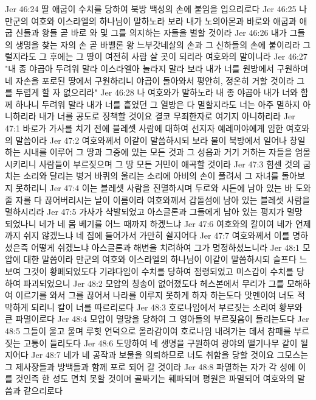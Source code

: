 Jer 46:24  딸 애굽이 수치를 당하여 북방 백성의 손에 붙임을 입으리로다
Jer 46:25  나 만군의 여호와 이스라엘의 하나님이 말하노라 보라 내가 노의아몬과 바로와 애굽과 애굽 신들과 왕들 곧 바로 와 및 그를 의지하는 자들을 벌할 것이라
Jer 46:26  내가 그들의 생명을 찾는 자의 손 곧 바벨론 왕 느부갓네살의 손과 그 신하들의 손에 붙이리라 그럴지라도 그 후에는 그 땅이 여전히 사람 살 곳이 되리라 여호와의 말이니라
Jer 46:27  "내 종 야곱아 두려워 말라 이스라엘아 놀라지 말라 보라 내가 너를 원방에서 구원하며 네 자손을 포로된 땅에서 구원하리니 야곱이 돌아와서 평안히, 정온히 거할 것이라 그를 두렵게 할 자 없으리라"
Jer 46:28  나 여호와가 말하노라 내 종 야곱아 내가 너와 함께 하나니 두려워 말라 내가 너를 흩었던 그 열방은 다 멸할지라도 너는 아주 멸하지 아니하리라 내가 너를 공도로 징책할 것이요 결코 무죄한자로 여기지 아니하리라
Jer 47:1  바로가 가사를 치기 전에 블레셋 사람에 대하여 선지자 예레미야에게 임한 여호와의 말씀이라
Jer 47:2  여호와께서 이같이 말씀하시되 보라 물이 북방에서 일어나 창일하는 시내를 이루어 그 땅과 그중에 있는 모든 것과 그 성읍과 거기 거하는 자들을 엄몰시키리니 사람들이 부르짖으며 그 땅 모든 거민이 애곡할 것이라
Jer 47:3  힘센 것의 굽 치는 소리와 달리는 병거 바퀴의 울리는 소리에 아비의 손이 풀려서 그 자녀를 돌아보지 못하리니
Jer 47:4  이는 블레셋 사람을 진멸하시며 두로와 시돈에 남아 있는 바 도와줄 자를 다 끊어버리시는 날이 이름이라 여호와께서 갑돌섬에 남아 있는 블레셋 사람을 멸하시리라
Jer 47:5  가사가 삭발되었고 아스글론과 그들에게 남아 있는 평지가 멸망 되었나니 네가 네 몸 베기를 어느 때까지 하겠느냐
Jer 47:6  여호와의 칼이여 네가 언제까지 쉬지 않겠느냐 네 집에 들어가서 가만히 쉴지어다
Jer 47:7  여호와께서 이를 명하셨은즉 어떻게 쉬겠느냐 아스글론과 해변을 치려하여 그가 명정하셨느니라
Jer 48:1  모압에 대한 말씀이라 만군의 여호와 이스라엘의 하나님이 이같이 말씀하시되 슬프다 느보여 그것이 황폐되었도다 기랴다임이 수치를 당하여 점령되었고 미스갑이 수치를 당하여 파괴되었으니
Jer 48:2  모압의 칭송이 없어졌도다 헤스본에서 무리가 그를 모해하여 이르기를 와서 그를 끊어서 나라를 이루지 못하게 하자 하는도다 맛멘이여 너도 적막하게 되리니 칼이 너를 따르리로다
Jer 48:3  호로나임에서 부르짖는 소리여 황무와 큰 파멸이로다
Jer 48:4  모압이 멸망을 당하여 그 영아들의 부르짖음이 들리는도다
Jer 48:5  그들이 울고 울며 루힛 언덕으로 올라감이여 호로나임 내려가는 데서 참패를 부르짖는 고통이 들리도다
Jer 48:6  도망하여 네 생명을 구원하여 광야의 떨기나무 같이 될지어다
Jer 48:7  네가 네 공작과 보물을 의뢰하므로 너도 취함을 당할 것이요 그모스는 그 제사장들과 방백들과 함께 포로 되어 갈 것이라
Jer 48:8  파멸하는 자가 각 성에 이를 것인즉 한 성도 면치 못할 것이며 골짜기는 훼파되며 평원은 파멸되어 여호와의 말씀과 같으리로다
